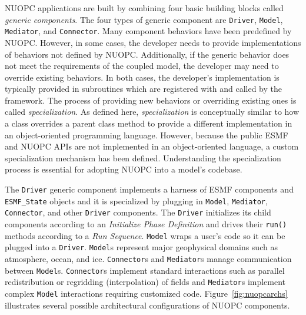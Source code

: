 \documentclass[oneside,11pt]{memoir}
\begin{document}

NUOPC applications are built by combining four basic building blocks called \emph{generic components}. The four types of generic component are \texttt{Driver}, \texttt{Model}, \texttt{Mediator}, and \texttt{Connector}. Many component behaviors have been predefined by NUOPC. However, in some cases, the developer needs to provide implementations of behaviors not defined by NUOPC. Additionally, if the generic behavior does not meet the requirements of the coupled model, the developer may need to override existing behaviors.  In both cases, the developer's implementation is typically provided in subroutines which are registered with and called by the framework. The process of providing new behaviors or overriding existing ones is called \emph{specialization}. As defined here, \emph{specialization} is conceptually similar to how a class overrides a parent class method to provide a different implementation in an object-oriented programming language. However, because the public ESMF and NUOPC APIs are not implemented in an object-oriented language, a custom specialization mechanism has been defined. Understanding the specialization process is essential for adopting NUOPC into a model's codebase.

The \texttt{Driver} generic component implements a harness of ESMF components and \texttt{ESMF\_State} objects and it is specialized by plugging in \texttt{Model}, \texttt{Mediator}, \texttt{Connector}, and other \texttt{Driver} components. The \texttt{Driver} initializes its child components according to an \emph{Initialize Phase Definition} and drives their \texttt{run()} methods according to a \emph{Run Sequence}. \texttt{Model} wraps a user's code so it can be plugged into a \texttt{Driver}. \texttt{Model}s represent major geophysical domains such as atmosphere, ocean, and ice. \texttt{Connector}s and \texttt{Mediator}s manage communication between \texttt{Model}s. \texttt{Connector}s implement standard interactions such as parallel redistribution or regridding (interpolation) of fields and \texttt{Mediator}s implement complex \texttt{Model} interactions requiring customized code. Figure~\ref{fig:nuopcarchs} illustrates several possible architectural configurations of NUOPC components.
\end{document}
